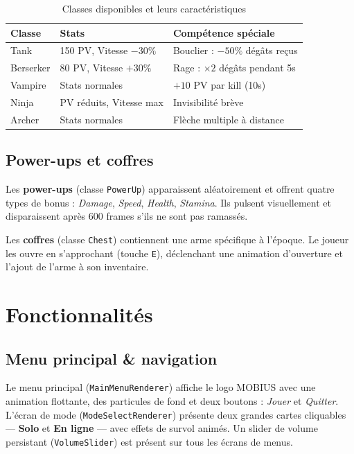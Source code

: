 \documentclass[12pt, a4paper]{report}
\begin{document}
\begin{table}[H]
\centering
\caption{Classes disponibles et leurs caract\'{e}ristiques}
\begin{tabular}{lll}
\toprule
\textbf{Classe} & \textbf{Stats} & \textbf{Comp\'{e}tence sp\'{e}ciale} \\
\midrule
Tank       & 150 PV, Vitesse $-30\%$ & Bouclier : $-50\%$ d\'{e}g\^{a}ts re\c{c}us \\
Berserker  & 80 PV, Vitesse $+30\%$  & Rage : $\times 2$ d\'{e}g\^{a}ts pendant 5s \\
Vampire    & Stats normales           & $+10$ PV par kill (10s) \\
Ninja      & PV r\'{e}duits, Vitesse max & Invisibilit\'{e} br\`{e}ve \\
Archer     & Stats normales           & Fl\`{e}che multiple \`{a} distance \\
\bottomrule
\end{tabular}
\end{table}

\subsection{Power-ups et coffres}

Les \textbf{power-ups} (classe \texttt{PowerUp}) apparaissent al\'{e}atoirement et offrent quatre types de bonus : \textit{Damage}, \textit{Speed}, \textit{Health}, \textit{Stamina}. Ils pulsent visuellement et disparaissent apr\`{e}s 600 frames s'ils ne sont pas ramass\'{e}s.

Les \textbf{coffres} (classe \texttt{Chest}) contiennent une arme sp\'{e}cifique \`{a} l'\'{e}poque. Le joueur les ouvre en s'approchant (touche \texttt{E}), d\'{e}clenchant une animation d'ouverture et l'ajout de l'arme \`{a} son inventaire.

\section{Fonctionnalit\'{e}s}

\subsection{Menu principal \& navigation}

Le menu principal (\texttt{MainMenuRenderer}) affiche le logo MOBIUS avec une animation flottante, des particules de fond et deux boutons : \textit{Jouer} et \textit{Quitter}. L'\'{e}cran de mode (\texttt{ModeSelectRenderer}) pr\'{e}sente deux grandes cartes cliquables --- \textbf{Solo} et \textbf{En ligne} --- avec effets de survol anim\'{e}s. Un slider de volume persistant (\texttt{VolumeSlider}) est pr\'{e}sent sur tous les \'{e}crans de menus.
\end{document}
